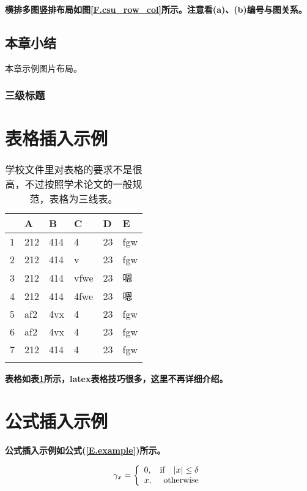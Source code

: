 \textbf{横排多图竖排布局如图\ref{F.csu_row_col}所示。注意看(a)、(b)编号与图关系。}

\subsection{本章小结}
本章示例图片布局。
\subsubsection{三级标题}

\newpage


\section{表格插入示例}

\begin{table}[htb]
  \centering
  \caption{学校文件里对表格的要求不是很高，不过按照学术论文的一般规范，表格为三线表。}
  \label{T.example}
  \begin{tabular}{llllll}
  \hline
   & A  & B  & C  & D  & E \\
  \hline
1 	& 212 & 414 & 4 		& 23 & fgw	\\
2 	& 212 & 414 & v 		& 23 & fgw	\\
3 	& 212 & 414 & vfwe		& 23 & 嗯	\\
4 	& 212 & 414 & 4fwe		& 23 & 嗯	\\
5 	& af2 & 4vx & 4 		& 23 & fgw	\\
6 	& af2 & 4vx & 4 		& 23 & fgw	\\
7 	& 212 & 414 & 4 		& 23 & fgw	\\

\hline{}
\end{tabular}
\end{table}

\textbf{表格如表\ref{T.example}所示，latex表格技巧很多，这里不再详细介绍。}

\lipsum

\newpage

\section{公式插入示例}

\lipsum

\textbf{公式插入示例如公式(\ref{E.example})所示。}

\begin{equation}
\gamma_{x}=
\left\{
  \begin{array}{lr}
  0, & {\rm if}~~\;|x| \leq \delta \\
  x, & {\rm otherwise}
  \end{array}
\right.
\label{E.example}
\end{equation}


